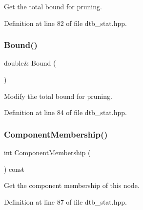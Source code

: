 Get the total bound for pruning. 



Definition at line 82 of file dtb\+\_\+stat.\+hpp.

\mbox{\label{classmlpack_1_1emst_1_1DTBStat_a421b6e4a396e0c1057e297e39a7d1b8b}} 
\subsubsection{Bound()\hspace{0.1cm}{\footnotesize\ttfamily [2/2]}}
{\footnotesize\ttfamily double\& Bound (\begin{DoxyParamCaption}{ }\end{DoxyParamCaption})\hspace{0.3cm}{\ttfamily [inline]}}



Modify the total bound for pruning. 



Definition at line 84 of file dtb\+\_\+stat.\+hpp.

\mbox{\label{classmlpack_1_1emst_1_1DTBStat_a3f07069a05538d0f822f9dca68371c7c}} 
\subsubsection{Component\+Membership()\hspace{0.1cm}{\footnotesize\ttfamily [1/2]}}
{\footnotesize\ttfamily int Component\+Membership (\begin{DoxyParamCaption}{ }\end{DoxyParamCaption}) const\hspace{0.3cm}{\ttfamily [inline]}}



Get the component membership of this node. 



Definition at line 87 of file dtb\+\_\+stat.\+hpp.

\mbox{\label{classmlpack_1_1emst_1_1DTBStat_a8a7729e91d7bab8346489e63d43b6026}} 
